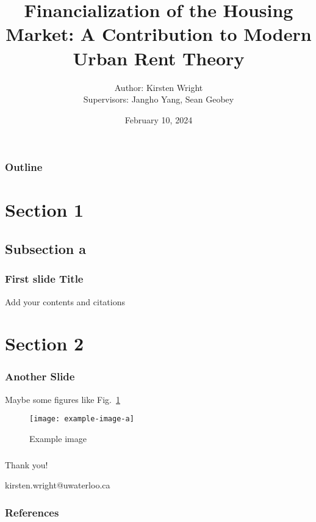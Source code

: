 \documentclass{beamer}
\title{ Financialization of the Housing Market: A Contribution to Modern Urban Rent Theory}
\author{
  Author: Kirsten Wright \\
  Supervisors: Jangho Yang, Sean Geobey
}
\institute{PhD Thesis Defense\\[1ex] University of Waterloo}
\date{February 10, 2024}
\begin{document}

{
    \maketitle
    
}

\begin{frame}
\frametitle{Outline}
\tableofcontents
\end{frame}

\section{Section 1}
\subsection{Subsection a}
\begin{frame}
    \frametitle{First slide Title}
    \small
    Add your contents and citations %
\end{frame}
\section{Section 2}
\begin{frame}
    \frametitle{Another Slide}
    \small
    Maybe some figures like Fig.~\ref{fig:my_label}
    \begin{figure}
        \centering
        \texttt{[image: example-image-a]}
        \caption{Example image}
        \label{fig:my_label}
    \end{figure}
\end{frame}


\begin{frame}
    \frametitle{}
    \centering
    
    \Large\color{oxfordblue}
    Thank you!

    \vspace{0.5cm}
    kirsten.wright@uwaterloo.ca

\end{frame}

\begin{frame}
\frametitle{References}
\small
\end{frame}

\end{document}
